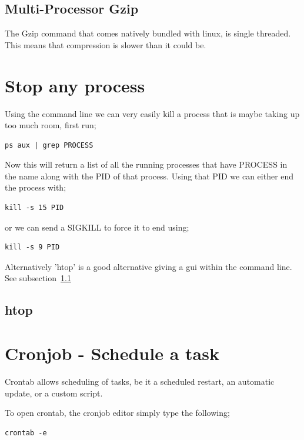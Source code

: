 \subsection{Multi-Processor Gzip}

The Gzip command that comes natively bundled with linux, is single threaded.  This means that compression is slower than it could be.  


\section{Stop any process}

Using the command line we can very easily kill a process that is maybe taking up too much room, first run;

\begin{lstlisting}
ps aux | grep PROCESS
\end{lstlisting}

Now this will return a list of all the running processes that have PROCESS in the name along with the PID of that process. Using that PID we can either end the process with;

\begin{lstlisting}
kill -s 15 PID
\end{lstlisting}

or we can send a SIGKILL to force it to end using;

\begin{lstlisting}
kill -s 9 PID
\end{lstlisting}

Alternatively 'htop' is a good alternative giving a gui within the command line.  See subsection~\ref{ssec:htop}

\subsection{htop}
\label{ssec:htop}



\section{Cronjob - Schedule a task}

Crontab allows scheduling of tasks, be it a scheduled restart, an automatic update, or a custom script.

To open crontab, the cronjob editor simply type the following;

\begin{lstlisting}
crontab -e
\end{lstlisting}

